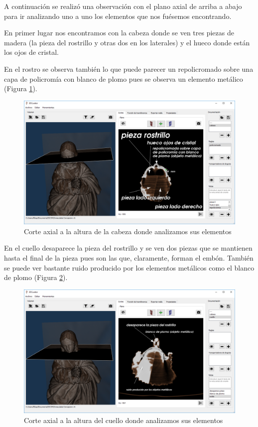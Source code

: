 A continuación se realizó una observación con el plano axial de arriba a abajo para ir analizando uno a uno los elementos que nos fuésemos encontrando.

En primer lugar nos encontramos con la cabeza donde se ven tres piezas de madera (la pieza del rostrillo y otras dos en los laterales) y el hueco donde están los ojos de cristal.

En el rostro se observa también lo que puede parecer un repolicromado sobre una capa de policromía con blanco de plomo pues se observa un elemento metálico (Figura \ref{fig:resultados/documentacion/inmaculada-concepcion/cabeza}).

\begin{figure}[H]
	\centering
	\includegraphics[width=12.5cm]{imagenes/resultados/documentacion/inmaculada-concepcion/cabeza}
	\caption{Corte axial a la altura de la cabeza donde analizamos sus elementos}
	\label{fig:resultados/documentacion/inmaculada-concepcion/cabeza}
\end{figure}

En el cuello desaparece la pieza del rostrillo y se ven dos piezas que se mantienen hasta el final de la pieza pues son las que, claramente, forman el embón. También se puede ver bastante ruido producido por los elementos metálicos como el blanco de plomo (Figura \ref{fig:resultados/documentacion/inmaculada-concepcion/cuello}).

\begin{figure}[H]
	\centering
	\includegraphics[width=12.5cm]{imagenes/resultados/documentacion/inmaculada-concepcion/cuello}
	\caption{Corte axial a la altura del cuello donde analizamos sus elementos}
	\label{fig:resultados/documentacion/inmaculada-concepcion/cuello}
\end{figure}

